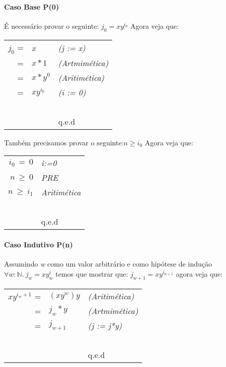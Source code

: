 \paragraph{Caso Base P(0)}
É necessário provar o seguinte: $ j_0 =xy^{i_0} $ Agora veja que:
 \begin{center}
     \begin{tabular}{rll}
         \emph{$j_0$} =& \emph{x} & \emph{(j := x)} \\
                      =& \emph{$x*1$}& \emph{(Artmimética)}\\ 
                      =& \emph{$x*y^0$}& \emph{(Aritimética)}\\        
                      =& \emph{$xy^{i_0}$}& \emph{(i := 0)}\\ 
         ~&~&~\\
         ~&~&q.e.d\\
     \end{tabular}
 \end{center}
Também precisamos provar o seguinte:$n \geq i_0$ Agora veja que:
 \begin{center}
     \begin{tabular}{rl}
         \emph{$i_0\ =\ 0$}& \emph{i:=0} \\
         \emph{$n\ \geq\ 0$}& \emph{PRE} \\
         \emph{$n\ \geq\ i_1$}& \emph{Aritimética} \\
         ~&~\\
         ~&q.e.d\\
     \end{tabular}
 \end{center}

\paragraph{Caso Indutivo P(n)}
Assumindo \emph{w} como um valor arbitrário e como hipótese de indução
$\forall w :\mathbb{N} .\ j_w=xy^i_w$ temos que mostrar que: 
$j_{w+1}=xy^{i_{w+1}}$ agora veja que:
 \begin{center}
     \begin{tabular}{rll}
         \emph{$xy^{i_w+1}$} =& \emph{$(xy^w)y$} & \emph{(Aritimética)} \\
                                  =& \emph{$j_w*y$}& \emph{(Artmimética)}\\ 
                                  =& \emph{$j_{w+1}$}& \emph{(j := j*y)}\\        
         ~&~&~\\
         ~&~&q.e.d\\
     \end{tabular}
 \end{center}

